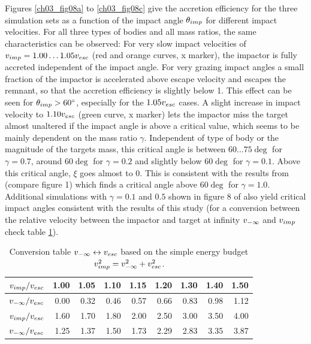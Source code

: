 Figures \ref{ch03_fig08a} to \ref{ch03_fig08c} give the accretion efficiency for the three simulation sets as a function of the impact angle $\theta_{imp}$ for different impact velocities. For all three types of bodies and all mass ratios, the same characteristics can be observed: For very slow impact velocities of $v_{imp} = 1.00 \dots 1.05 v_{esc}$ (red and orange curves, x marker), the impactor is fully accreted independent of the impact angle. For very grazing impact angles a small fraction of the impactor is accelerated above escape velocity and escapes the remnant, so that the accretion efficiency is slightly below 1. This effect can be seen for $\theta_{imp} > 60 ^\circ$, especially for the $1.05 v_{esc}$ cases. A slight increase in impact velocity to $1.10 v_{esc}$ (green curve, x marker) lets the impactor miss the target almost unaltered if the impact angle is above a critical value, which seems to be mainly dependent on the mass ratio $\gamma$. Independent of type of body or the magnitude of the targets mass, this critical angle is between $60 \dots 75 \deg$ for $\gamma = 0.7$,  around $60 \deg$ for $\gamma = 0.2$ and slightly below $60 \deg$ for $\gamma = 0.1$. Above this critical angle, $\xi$ goes almost to 0. This is consistent with the results from \cite{Agnor:2004p3329} (compare figure 1) which finds a critical angle above $60 \deg$ for $\gamma = 1.0$. Additional simulations with $\gamma = 0.1$ and $0.5$ shown in figure 8 of \cite{Asphaug:2010p3539} also yield critical impact angles consistent with the results of this study (for a conversion between the relative velocity between the impactor and target at infinity $v_{-\infty}$ and $v_{imp}$ check table \ref{ch03_tbl01}).
\begin{table}[htdp]
\begin{center}
\begin{tabular}{l|r|r|r|r|r|r|r|r}
$v_{imp} / v_{esc}$ & 1.00 & 1.05 & 1.10 & 1.15 & 1.20 & 1.30 & 1.40 & 1.50 \\
\hline
$v_{-\infty} / v_{esc}$ & 0.00 & 0.32 & 0.46 & 0.57 & 0.66 & 0.83 & 0.98 & 1.12\\
\hline
\hline
$v_{imp} / v_{esc}$ & 1.60 & 1.70 & 1.80 & 2.00 & 2.50 & 3.00 & 3.50 & 4.00\\
\hline
$v_{-\infty} / v_{esc}$ & 1.25 & 1.37 & 1.50 & 1.73 & 2.29 & 2.83 & 3.35 & 3.87\\
\end{tabular}
\end{center}
\caption{Conversion table $v_{-\infty} \leftrightarrow v_{esc}$ based on the simple energy budget $v_{imp}^2 = v_{-\infty}^2 + v_{esc}^2$.}
\label{ch03_tbl01}
\end{table} 
